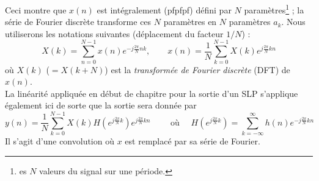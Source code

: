 	


\newpage
Ceci montre que $x(n)$ est intégralement (pfpfpf) défini par $N$ paramètres\footnote{
es $N$ valeurs du signal sur une période.} ; la série de Fourier discrète transforme 
ces $N$ paramètres en $N$ paramètres $a_k$. Nous utiliserons les notations suivantes 
(déplacement du facteur $1/N$) :
\begin{equation}
X(k) = \sum_{n=0}^{N-1} x(n)e^{-j\frac{2\pi}{N}nk},\qquad x(n) =\frac{1}{N}\sum_{
k=0}^{N-1} X(k)e^{j\frac{2\pi}{N}kn}
\end{equation}
où $X(k)$ ($=X(k+N)$) est la \textit{transformée de Fourier discrète} (DFT) de $x(n)$.\\
La linéarité appliquée en début de chapitre pour la sortie d'un SLP s'applique également 
ici de sorte que la sortie sera donnée par
\begin{equation}
y(n) = \frac{1}{N}\sum_{k=0}^{N-1} X(k)H\left(e^{j\frac{2\pi}{N}k}\right)
e^{j\frac{2\pi}{N}kn}\qquad \text{ où }\quad H\left(e^{j\frac{2\pi}{N}k}\right) = 
\sum_{k=-\infty}^\infty h(n)e^{-j\frac{2\pi}{N}kn}
\end{equation}
Il s'agit d'une convolution où $x$ est remplacé par sa série de Fourier.
	
